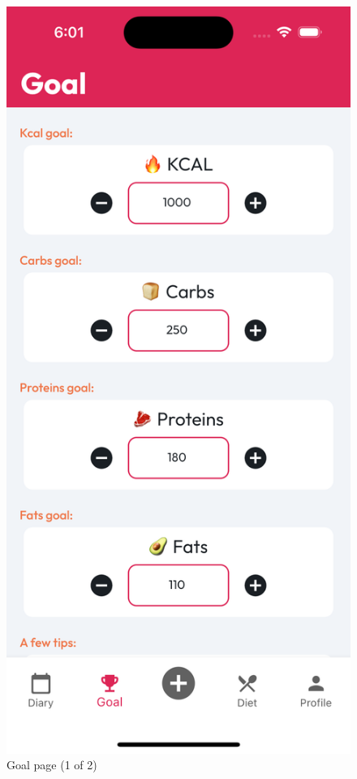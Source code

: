 \documentclass{Configuration_Files/PoliMi3i_thesis}
\begin{document}
\begin{figure}[!h]
  \includegraphics[scale=0.1]{Images/Screenshots/Mobile/Goal1Light.png}
  \caption{Goal page (1 of 2)}
\end{figure}
\end{document}
